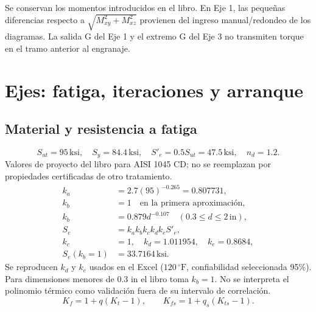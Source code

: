\documentclass[11pt,a4paper]{article}
\newcommand{\inch}{\,\mathrm{in}}
\newcommand{\ksi}{\,\mathrm{ksi}}
\begin{document}
Se conservan los momentos introducidos en el libro. En Eje 1, las pequeñas diferencias respecto a $\sqrt{M_{xy}^2+M_{xz}^2}$ provienen del ingreso manual/redondeo de los diagramas. La salida G del Eje 1 y el extremo G del Eje 3 no transmiten torque en el tramo anterior al engranaje.

\section{Ejes: fatiga, iteraciones y arranque}
\subsection{Material y resistencia a fatiga}
\[
S_{ut}=95\ksi,\quad S_y=84.4\ksi,\quad S'_e=0.5S_{ut}=47.5\ksi,\quad n_d=1.2.
\]
Valores de proyecto del libro para AISI 1045 CD; no se reemplazan por propiedades certificadas de otro tratamiento.
\begin{align*}
k_a&=2.7(95)^{-0.265}=0.807731,\\
k_b&=1\quad\text{en la primera aproximación},\\
k_b&=0.879d^{-0.107}\quad(0.3\leq d\leq2\inch),\\
S_e&=k_ak_bk_ck_dk_eS'_e,\\
k_c&=1,\quad k_d=1.011954,\quad k_e=0.8684,\\
S_e(k_b=1)&=33.7164\ksi.
\end{align*}
Se reproducen $k_d$ y $k_e$ usados en el Excel ($120\,^{\circ}\mathrm F$, confiabilidad seleccionada 95\%). Para dimensiones menores de 0.3 in el libro toma $k_b=1$. No se interpreta el polinomio térmico como validación fuera de su intervalo de correlación.
\[
K_f=1+q(K_t-1),\qquad K_{fs}=1+q_s(K_{ts}-1).
\]
\end{document}
